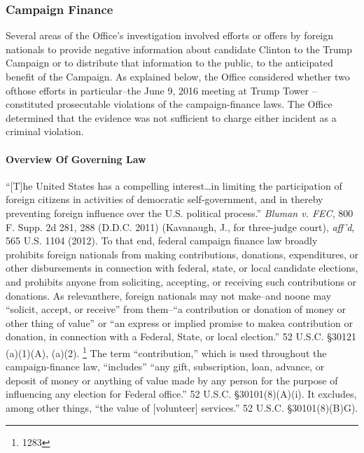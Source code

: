 \subsubsection{Campaign Finance}
Several areas of the Office's investigation involved efforts or offers by foreign nationals to provide negative information about candidate Clinton to the Trump Campaign or to distribute that information to the public, to the anticipated benefit of the Campaign. 
As explained below, the Office considered whether two ofthose efforts in particular--the June 9, 2016 meeting at Trump Tower --constituted prosecutable violations of the campaign-finance laws. 
The Office determined that the evidence was not sufficient to charge either incident as a criminal violation.

\paragraph{Overview Of Governing Law}

``[T]he United States has a compelling interest\dots in limiting the participation of foreign citizens in activities of democratic self-government, and in thereby preventing foreign influence over the U.S. political process.'' 
\textit{Bluman v. FEC}, 800 F. Supp. 2d 281, 288 (D.D.C. 2011) (Kavanaugh, J., for three-judge court), \textit{aff'd}, 565 U.S. 1104 (2012). 
To that end, federal campaign finance law broadly prohibits foreign nationals from making contributions, donations, expenditures, or other disbursements in connection with federal, state, or local candidate elections, and prohibits anyone from soliciting, accepting, or receiving such contributions or donations.
As relevanthere, foreign nationals may not make--and noone may ``solicit, accept, or receive'' from them--``a contribution or donation of money or other thing of value'' or ``an express or implied promise to makea contribution or donation, in connection with a Federal, State, or local election.'' 
52 U.S.C. \S 30121 (a)(1)(A), (a)(2).%
\footnote{1283}
The term ``contribution,'' which is used throughout the campaign-finance law, ``includes'' ``any gift, subscription, loan, advance, or deposit of money or anything of value made by any person for the purpose of influencing any election for Federal office.'' 
52 U.S.C. \S 30101(8)(A)(i). 
It excludes, among other things, ``the value of [volunteer] services.'' 52 U.S.C. \S 30101(8)(B)G).

